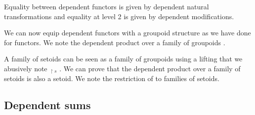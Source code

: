   Equality between dependent functors is given by dependent natural transformations
  and equality at level 2 is given by dependent modifications.
\begin{coqdoccode}
\coqdocemptyline
\coqdocemptyline
\end{coqdoccode}
\noindent We can now equip dependent functors with a groupoid structure
    as we have done for functors.
    We note   the dependent product over a family of groupoids .
\begin{coqdoccode}
\coqdocemptyline
\end{coqdoccode}
A family of setoids can be seen as a family of groupoids using a
lifting that we abusively note   $_{\upharpoonright s}$ . We can prove that the
dependent product over a family of setoids is also a setoid. We note
 the restriction of  to families of setoids.  \begin{coqdoccode}
\coqdocemptyline
\end{coqdoccode}
\subsection{Dependent sums}




